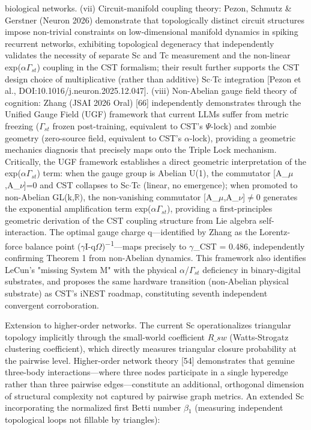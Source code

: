 \documentclass[a4paper,12pt]{article}
\providecommand{\textsubscript}[1]{\ensuremath{_{\text{#1}}}}
\begin{document}
biological networks. (vii) Circuit-manifold coupling theory: Pezon, Schmutz & Gerstner (Neuron 2026) demonstrate that topologically distinct circuit structures impose non-trivial constraints on low-dimensional manifold dynamics in spiking recurrent networks, exhibiting topological degeneracy that independently validates the necessity of separate Sc and Tc measurement and the non-linear
exp($\alpha$\cdot$\Gamma_{st}$) coupling in the CST formalism; their result further supports the CST design choice of multiplicative (rather than additive) Sc$\cdot$Tc integration [Pezon et al., DOI:10.1016/j.neuron.2025.12.047]. (viii) Non-Abelian gauge field theory of cognition: Zhang (JSAI 2026 Oral) [66] independently demonstrates through the Unified Gauge Field (UGF) framework that current
LLMs suffer from metric freezing ($\Gamma_{st}$ frozen post-training, equivalent to CST's $\Psi$-lock) and zombie geometry (zero-source field, equivalent to CST's $\alpha$-lock), providing a geometric mechanics diagnosis that precisely maps onto the Triple Lock mechanism.
Critically, the UGF framework establishes a direct geometric interpretation of the exp($\alpha$\cdot$\Gamma_{st}$) term: when the gauge group is Abelian U(1), the commutator [A_$\mu$,A_$\nu$]=0 and CST collapses to Sc$\cdot$Tc (linear, no emergence); when promoted to non-Abelian GL(k,$\mathbb{R}$), the non-vanishing commutator [A_$\mu$,A_$\nu$]$\neq$0 generates the exponential amplification term
exp($\alpha$\cdot$\Gamma_{st}$), providing a first-principles geometric derivation of the CST coupling structure from Lie algebra self-interaction.
The optimal gauge charge q---identified by Zhang as the Lorentz-force balance point ($\gamma$I-q$\Omega$)\textsuperscript{$-$}\textsuperscript{1}---maps precisely to $\gamma$_CST = 0.486, independently confirming Theorem 1 from non-Abelian dynamics.
This framework also identifies LeCun's "missing System M" with the physical $\alpha$/$\Gamma_{st}$ deficiency in binary-digital substrates, and proposes the same hardware transition (non-Abelian physical substrate) as CST's iNEST roadmap, constituting seventh independent convergent corroboration.


Extension to higher-order networks.
The current Sc operationalizes triangular topology implicitly through the small-world coefficient $R\_{sw}$ (Watts-Strogatz clustering coefficient), which directly measures triangular closure probability at the pairwise level.
Higher-order network theory [54] demonstrates that genuine three-body interactions---where three nodes participate in a single hyperedge rather than three pairwise edges---constitute an additional, orthogonal dimension of structural complexity not captured by pairwise graph metrics.
An extended Sc incorporating the normalized first Betti number $\beta$\textsubscript{1} (measuring independent topological loops not fillable by triangles):
\end{document}
